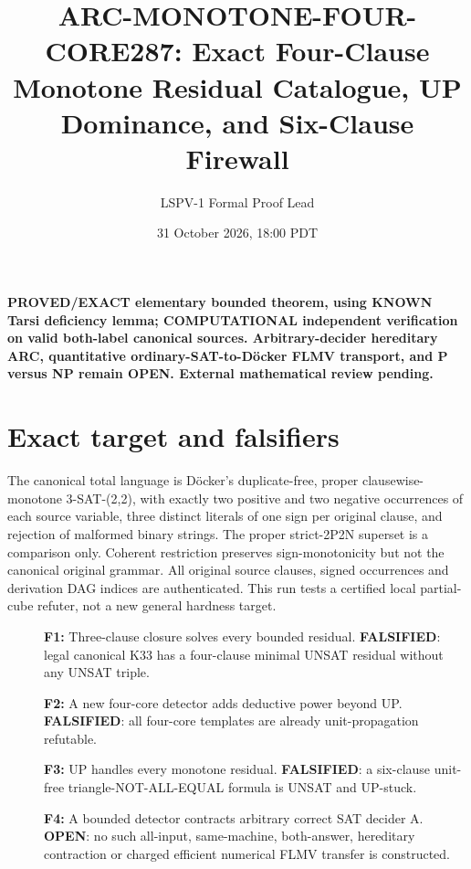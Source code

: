 \documentclass[11pt]{article}
\title{ARC-MONOTONE-FOUR-CORE287: Exact Four-Clause Monotone Residual Catalogue, UP Dominance, and Six-Clause Firewall}
\author{LSPV-1 Formal Proof Lead}
\date{31 October 2026, 18:00 PDT}
\begin{document}
\maketitle
\noindent\textbf{PROVED/EXACT elementary bounded theorem, using KNOWN Tarsi deficiency lemma; COMPUTATIONAL independent verification on valid both-label canonical sources. Arbitrary-decider hereditary ARC, quantitative ordinary-SAT-to-D\"ocker FLMV transport, and P versus NP remain OPEN. External mathematical review pending.}

\section{Exact target and falsifiers}
The canonical total language is D\"ocker's duplicate-free, proper clausewise-monotone 3-SAT-(2,2), with exactly two positive and two negative occurrences of each source variable, three distinct literals of one sign per original clause, and rejection of malformed binary strings. The proper strict-2P2N superset is a comparison only. Coherent restriction preserves sign-monotonicity but not the canonical original grammar. All original source clauses, signed occurrences and derivation DAG indices are authenticated. This run tests a certified local partial-cube refuter, not a new general hardness target.
\begin{description}
\item[]\textbf{F1:} Three-clause closure solves every bounded residual. \textbf{FALSIFIED}: legal canonical K33 has a four-clause minimal UNSAT residual without any UNSAT triple.
\item[]\textbf{F2:} A new four-core detector adds deductive power beyond UP. \textbf{FALSIFIED}: all four-core templates are already unit-propagation refutable.
\item[]\textbf{F3:} UP handles every monotone residual. \textbf{FALSIFIED}: a six-clause unit-free triangle-NOT-ALL-EQUAL formula is UNSAT and UP-stuck.
\item[]\textbf{F4:} A bounded detector contracts arbitrary correct SAT decider A. \textbf{OPEN}: no such all-input, same-machine, both-answer, hereditary contraction or charged efficient numerical FLMV transfer is constructed.
\end{description}
\end{document}
